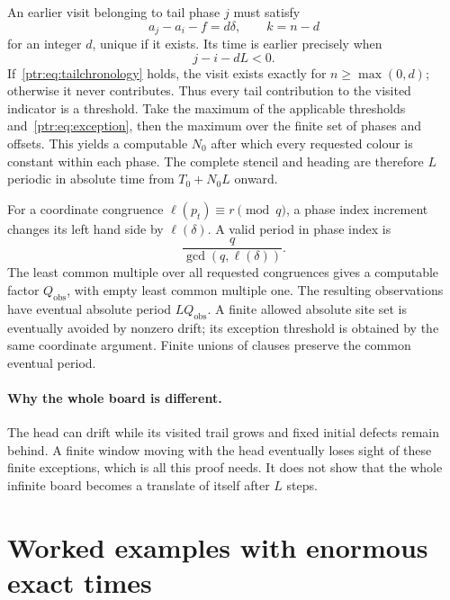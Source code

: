 \documentclass[11pt,letterpaper]{article}
\theoremstyle{definition}\newtheorem{definition}[theorem]{Definition}
\theoremstyle{remark}\newtheorem{remark}[theorem]{Remark}
\begin{document}
An earlier visit belonging to tail phase $j$ must satisfy
\[
 a_j-a_i-f=d\delta,\qquad k=n-d
\]
for an integer $d$, unique if it exists. Its time is earlier precisely when
\begin{equation}\label{ptr:eq:tailchronology}
 j-i-dL<0.
\end{equation}
If~\eqref{ptr:eq:tailchronology} holds, the visit exists exactly for $n\ge\max(0,d)$; otherwise it never contributes. Thus every tail contribution to the visited indicator is a threshold. Take the maximum of the applicable thresholds and~\eqref{ptr:eq:exception}, then the maximum over the finite set of phases and offsets. This yields a computable $N_0$ after which every requested colour is constant within each phase. The complete stencil and heading are therefore $L$ periodic in absolute time from $T_0+N_0L$ onward.

For a coordinate congruence $\ell(p_t)\equiv r\pmod q$, a phase index increment changes its left hand side by $\ell(\delta)$. A valid period in phase index is
\[
 \frac{q}{\gcd(q,\ell(\delta))}.
\]
The least common multiple over all requested congruences gives a computable factor $Q_{\mathrm{obs}}$, with empty least common multiple one. The resulting observations have eventual absolute period $LQ_{\mathrm{obs}}$. A finite allowed absolute site set is eventually avoided by nonzero drift; its exception threshold is obtained by the same coordinate argument. Finite unions of clauses preserve the common eventual period.

\paragraph{Why the whole board is different.}
The head can drift while its visited trail grows and fixed initial defects remain behind. A finite window moving with the head eventually loses sight of these finite exceptions, which is all this proof needs. It does not show that the whole infinite board becomes a translate of itself after $L$ steps.

\section{Worked examples with enormous exact times}\label{ptr:sec:examples}
\end{document}
